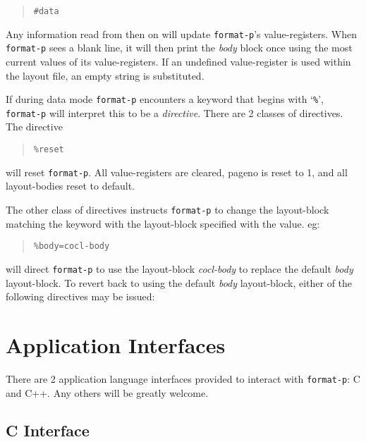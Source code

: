 \documentclass[a4paper,twoside]{article}
\begin{document}
		\begin{quote}
			\texttt{\#data}
		\end{quote}

	Any information read from then on will update
	\texttt{format-p}'s value-registers.
	When \texttt{format-p} sees a blank line, it will then print the
	\emph{body} block once using the most current values of its
	value-registers. If an undefined value-register is used within
	the layout file, an empty string is substituted.

	If during data mode \texttt{format-p} encounters a keyword that
	begins with `\texttt{\%}', \texttt{format-p} will interpret this
	to be a \emph{directive}. There are 2 classes of directives. The
	directive

		\begin{quote}
			\texttt{\%reset}
		\end{quote}

	will reset \texttt{format-p}. All value-registers are cleared, 
	\textsf{pageno} is reset to 1, and all layout-bodies reset to
	default.

	The other class of directives instructs \texttt{format-p} to change
	the layout-block matching the
	keyword with the layout-block specified with the value. eg:

		\begin{quote}
			\texttt{\%body=cocl-body}
		\end{quote}

	will direct \texttt{format-p} to use the layout-block
	\emph{cocl-body} to replace the default \emph{body} layout-block.
	To revert back to using the default \emph{body} layout-block,
	either of the following directives may be issued:

		\begin{quote}
			\begin{alltt}
				%body=body
				%body=
				%body
			\end{alltt}
		\end{quote}

\section{Application Interfaces}

	There are 2 application language interfaces provided to interact with
	\texttt{format-p}: C and C++. Any others will be greatly welcome.

\subsection{C Interface}
\end{document}
